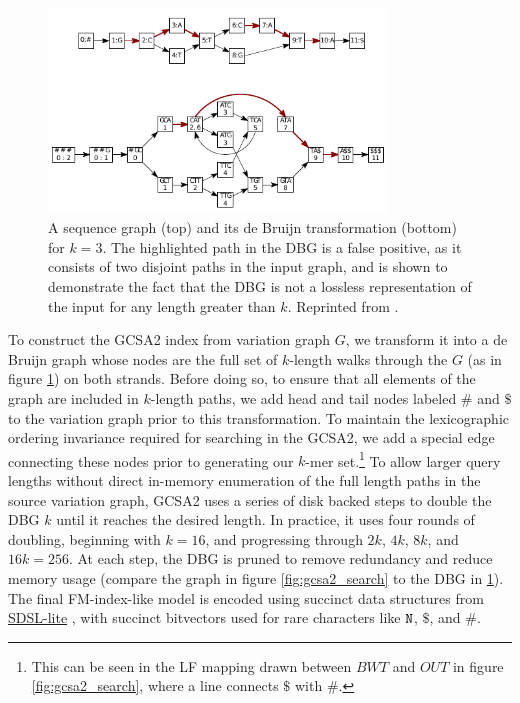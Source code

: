 \begin{figure}[htbp!]
  \centering
  \includegraphics[width=0.8\textwidth]{Chapter2/Figs/sequence_graph_to_DBG.pdf}
  \caption[A sequence graph and its de Bruijn transformation]{
    A sequence graph (top) and its de Bruijn transformation (bottom) for $k=3$.
    The highlighted path in the DBG is a false positive, as it consists of two disjoint paths in the input graph, and is shown to demonstrate the fact that the DBG is not a lossless representation of the input for any length greater than $k$.
    Reprinted from \cite{siren2017indexing}.
  }
  \label{fig:seq_graph_to_dbg}
\end{figure}

To construct the GCSA2 index from variation graph $G$, we transform it into a de Bruijn graph whose nodes are the full set of $k$-length walks through the $G$ (as in figure \ref{fig:seq_graph_to_dbg}) on both strands.
Before doing so, to ensure that all elements of the graph are included in $k$-length paths, we add head and tail nodes labeled $\#$ and $\$$ to the variation graph prior to this transformation.
To maintain the lexicographic ordering invariance required for searching in the GCSA2, we add a special edge connecting these nodes prior to generating our $k$-mer set.\footnote{This can be seen in the LF mapping drawn between $BWT$ and $OUT$ in figure \ref{fig:gcsa2_search}, where a line connects $\$$ with $\#$.}
To allow larger query lengths without direct in-memory enumeration of the full length paths in the source variation graph, GCSA2 uses a series of disk backed steps to double the DBG $k$ until it reaches the desired length.
In practice, it uses four rounds of doubling, beginning with $k=16$, and progressing through $2k$, $4k$, $8k$, and $16k = 256$.
At each step, the DBG is pruned to remove redundancy and reduce memory usage (compare the graph in figure \ref{fig:gcsa2_search} to the DBG in \ref{fig:seq_graph_to_dbg}).
The final FM-index-like model is encoded using succinct data structures from \href{https://github.com/simongog/sdsl-lite}{SDSL-lite} \cite{gbmp2014sea}, with succinct bitvectors used for rare characters like ${\tt N}$, $\$$, and $\#$.

